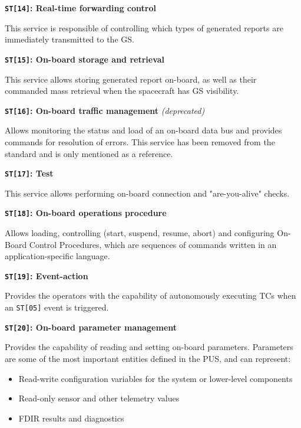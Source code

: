 \documentclass[a4paper,nobib]{tufte-book}
\begin{document}
\begin{compactitem}
	\item \textbf{\texttt{ST[14]}: Real-time forwarding control}
	
	This service is responsible of controlling which types of generated reports are immediately transmitted to the \acl{GS}.
	
	\item \textbf{\texttt{ST[15]}: On-board storage and retrieval}
	
	This service allows storing generated report on-board, as well as their commanded mass retrieval when the spacecraft has \acl{GS} visibility.
	
	\item \textbf{\texttt{ST[16]}: On-board traffic management} \emph{(deprecated)}
	
	Allows monitoring the status and load of an on-board data bus and provides commands for resolution of errors. This service has been removed from the standard and is only mentioned as a reference.
	
	\item \textbf{\texttt{ST[17]}: Test}
	
	This service allows performing on-board connection and "are-you-alive" checks.
	
	\item \textbf{\texttt{ST[18]}: On-board operations procedure}
	
	Allows loading, controlling (start, suspend, resume, abort) and configuring On-Board Control Procedures, which are sequences of commands written in an application-specific language.
	
	\item \textbf{\texttt{ST[19]}: Event-action}
	
	Provides the operators with the capability of autonomously executing \acp{TC} when an \texttt{ST[05]} event is triggered.
	
	\item \textbf{\texttt{ST[20]}: On-board parameter management}
	
	Provides the capability of reading and setting on-board parameters. Parameters are some of the most important entities defined in the \acs{PUS}, and can represent:
	\begin{itemize}
		\item Read-write configuration variables for the system or lower-level components
		\item Read-only sensor and other telemetry values
		\item \ac{FDIR} results and diagnostics
	\end{itemize}
	

\end{compactitem}
\end{document}

